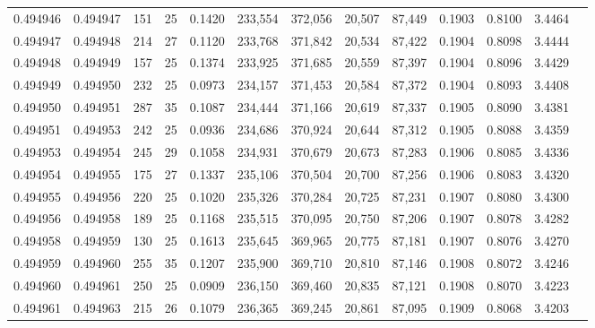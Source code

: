 \begin{tabular}{rrrrrrrrrrrrr}
0.494946 & 0.494947 & 151 &  25 &                                     0.1420 & 233,554 & 372,056 &  20,507 &  87,449 & 0.1903 & 0.8100 & 3.4464 \\
0.494947 & 0.494948 & 214 &  27 &                                     0.1120 & 233,768 & 371,842 &  20,534 &  87,422 & 0.1904 & 0.8098 & 3.4444 \\
0.494948 & 0.494949 & 157 &  25 &                                     0.1374 & 233,925 & 371,685 &  20,559 &  87,397 & 0.1904 & 0.8096 & 3.4429 \\
0.494949 & 0.494950 & 232 &  25 &                                     0.0973 & 234,157 & 371,453 &  20,584 &  87,372 & 0.1904 & 0.8093 & 3.4408 \\
0.494950 & 0.494951 & 287 &  35 &                                     0.1087 & 234,444 & 371,166 &  20,619 &  87,337 & 0.1905 & 0.8090 & 3.4381 \\
0.494951 & 0.494953 & 242 &  25 &                                     0.0936 & 234,686 & 370,924 &  20,644 &  87,312 & 0.1905 & 0.8088 & 3.4359 \\
0.494953 & 0.494954 & 245 &  29 &                                     0.1058 & 234,931 & 370,679 &  20,673 &  87,283 & 0.1906 & 0.8085 & 3.4336 \\
0.494954 & 0.494955 & 175 &  27 &                                     0.1337 & 235,106 & 370,504 &  20,700 &  87,256 & 0.1906 & 0.8083 & 3.4320 \\
0.494955 & 0.494956 & 220 &  25 &                                     0.1020 & 235,326 & 370,284 &  20,725 &  87,231 & 0.1907 & 0.8080 & 3.4300 \\
0.494956 & 0.494958 & 189 &  25 &                                     0.1168 & 235,515 & 370,095 &  20,750 &  87,206 & 0.1907 & 0.8078 & 3.4282 \\
0.494958 & 0.494959 & 130 &  25 &                                     0.1613 & 235,645 & 369,965 &  20,775 &  87,181 & 0.1907 & 0.8076 & 3.4270 \\
0.494959 & 0.494960 & 255 &  35 &                                     0.1207 & 235,900 & 369,710 &  20,810 &  87,146 & 0.1908 & 0.8072 & 3.4246 \\
0.494960 & 0.494961 & 250 &  25 &                                     0.0909 & 236,150 & 369,460 &  20,835 &  87,121 & 0.1908 & 0.8070 & 3.4223 \\
0.494961 & 0.494963 & 215 &  26 &                                     0.1079 & 236,365 & 369,245 &  20,861 &  87,095 & 0.1909 & 0.8068 & 3.4203 \\

\end{tabular}
